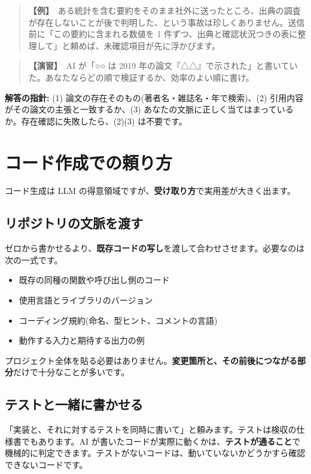 \documentclass{article}
\begin{document}
\begin{quote}
\textbf{【例】}\ ある統計を含む要約をそのまま社外に送ったところ、出典の調査が存在しないことが後で判明した、という事故は珍しくありません。送信前に「この要約に含まれる数値を 1 件ずつ、出典と確認状況つきの表に整理して」と頼めば、未確認項目が先に浮かびます。
\end{quote}

\begin{quote}
\textbf{【演習】}\ AI が「○○ は 2019 年の論文『△△』で示された」と書いていた。あなたならどの順で検証するか、効率のよい順に書け。
\end{quote}

\textbf{解答の指針:} (1) 論文の存在そのもの(著者名・雑誌名・年で検索)、(2) 引用内容がその論文の主張と一致するか、(3) あなたの文脈に正しく当てはまっているか。存在確認に失敗したら、(2)(3) は不要です。

\section{コード作成での頼り方}

コード生成は LLM の得意領域ですが、\textbf{受け取り方}で実用差が大きく出ます。

\subsection{リポジトリの文脈を渡す}

ゼロから書かせるより、\textbf{既存コードの写し}を渡して合わせさせます。必要なのは次の一式です。

\begin{itemize}
\item 既存の同種の関数や呼び出し側のコード
\item 使用言語とライブラリのバージョン
\item コーディング規約(命名、型ヒント、コメントの言語)
\item 動作する入力と期待する出力の例
\end{itemize}

プロジェクト全体を貼る必要はありません。\textbf{変更箇所と、その前後につながる部分}だけで十分なことが多いです。

\subsection{テストと一緒に書かせる}

「実装と、それに対するテストを同時に書いて」と頼みます。テストは検収の仕様書でもあります。AI が書いたコードが実際に動くかは、\textbf{テストが通ること}で機械的に判定できます。テストがないコードは、動いていないかどうかすら確認できないコードです。
\end{document}
